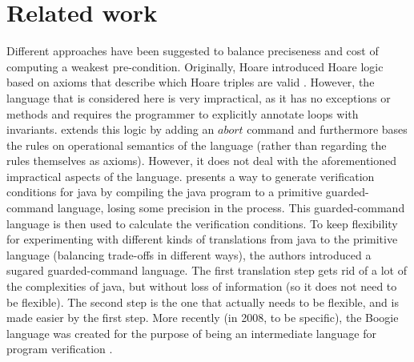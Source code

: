 \documentclass[a4paper, fleqn]{article}
\begin{document}
\section{Related work}
Different approaches have been suggested to balance preciseness and cost of computing a weakest pre-condition. Originally, Hoare introduced Hoare logic based on axioms that describe which Hoare triples are valid \cite{hoare}. However, the language that is considered here is very impractical, as it has no exceptions or methods and requires the programmer to explicitly annotate loops with invariants. \cite{homeier} extends this logic by adding an $abort$ command and furthermore bases the rules on operational semantics of the language (rather than regarding the rules themselves as axioms). However, it does not deal with the aforementioned impractical aspects of the language. \cite{guardedcommands} presents a way to generate verification conditions for java by compiling the java program to a primitive guarded-command language, losing some precision in the process. This guarded-command language is then used to calculate the verification conditions. To keep flexibility for experimenting with different kinds of translations from java to the primitive language (balancing trade-offs in different ways), the authors introduced a sugared guarded-command language. The first translation step gets rid of a lot of the complexities of java, but without loss of information (so it does not need to be flexible). The second step is the one that actually needs to be flexible, and is made easier by the first step. More recently (in 2008, to be specific), the Boogie language was created for the purpose of being an intermediate language for program verification \cite{boogie}\cite{boogiethesis}.
\\
\end{document}

